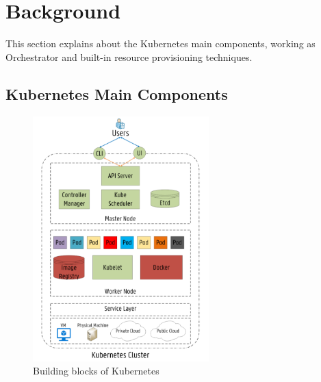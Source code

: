 \section{Background}
\label{sec:backgroud}
This section explains about the Kubernetes main components, working as Orchestrator and built-in resource provisioning techniques.
\subsection{Kubernetes Main Components}
\label{sec:k8s_main_comp}
\begin{figure}
  \centering
  \includegraphics[width=68mm]{figures/mlcn-k8s-components.pdf}
  \caption{Building blocks of Kubernetes\cite{Santos2019}}
  \label{fig:k8s-comp}
\end{figure}
